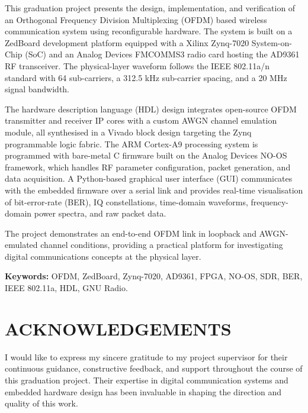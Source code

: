 \documentclass[12pt, a4paper, oneside]{report}
\begin{document}
\vspace{0.5cm}

This graduation project presents the design, implementation, and verification of an Orthogonal Frequency Division Multiplexing (OFDM) based wireless communication system using reconfigurable hardware. The system is built on a ZedBoard development platform equipped with a Xilinx Zynq-7020 System-on-Chip (SoC) and an Analog Devices FMCOMMS3 radio card hosting the AD9361 RF transceiver. The physical-layer waveform follows the IEEE 802.11a/n standard with 64 sub-carriers, a 312.5 kHz sub-carrier spacing, and a 20 MHz signal bandwidth.

The hardware description language (HDL) design integrates open-source OFDM transmitter and receiver IP cores with a custom AWGN channel emulation module, all synthesised in a Vivado block design targeting the Zynq programmable logic fabric. The ARM Cortex-A9 processing system is programmed with bare-metal C firmware built on the Analog Devices NO-OS framework, which handles RF parameter configuration, packet generation, and data acquisition. A Python-based graphical user interface (GUI) communicates with the embedded firmware over a serial link and provides real-time visualisation of bit-error-rate (BER), IQ constellations, time-domain waveforms, frequency-domain power spectra, and raw packet data.

The project demonstrates an end-to-end OFDM link in loopback and AWGN-emulated channel conditions, providing a practical platform for investigating digital communications concepts at the physical layer.

\vspace{0.5cm}
\noindent\textbf{Keywords:} OFDM, ZedBoard, Zynq-7020, AD9361, FPGA, NO-OS, SDR, BER, IEEE 802.11a, HDL, GNU Radio.

\chapter*{ACKNOWLEDGEMENTS}
\thispagestyle{plain}

I would like to express my sincere gratitude to my project supervisor for their continuous guidance, constructive feedback, and support throughout the course of this graduation project. Their expertise in digital communication systems and embedded hardware design has been invaluable in shaping the direction and quality of this work.
\end{document}
